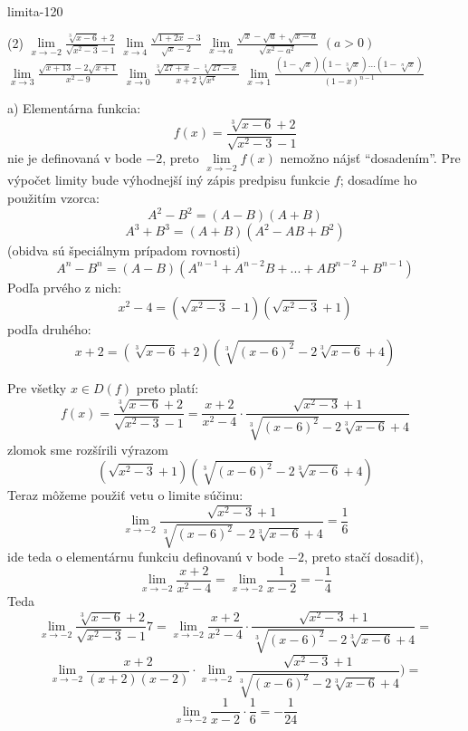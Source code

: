 \begin{defproblem}{limita-120}
\begin{tasks}(2)
    \task $\lim\limits_{{x \to -2}} \frac{\sqrt[3]{x-6}+2}{\sqrt{x^2-3}-1}$
    \task $\lim\limits_{{x \to 4}} \frac{\sqrt{1+2x}-3}{\sqrt{x}-2}$
    \task $\lim\limits_{{x \to a}} \frac{\sqrt{x}-\sqrt{a}+\sqrt{x-a}}{\sqrt{x^2-a^2}}$ $(a>0)$
    \task $\lim\limits_{{x \to 3}} \frac{\sqrt{x+13}-2\sqrt{x+1}}{x^2-9}$
    \task $\lim\limits_{{x \to 0}} \frac{\sqrt[3]{27+x}-\sqrt[3]{27-x}}{x+2\sqrt[3]{x^4}}$
    \task $\lim\limits_{{x \to 1}} \frac{(1-\sqrt{x})(1-\sqrt[3]{x})...(1-\sqrt[n]{x})}{(1-x)^{n-1}}$
\end{tasks}
\begin{solution}
    a) Elementárna funkcia:
    \[
        f(x) = \frac{\sqrt[3]{x - 6} + 2}{\sqrt{x^2 - 3} - 1}
    \]
    nie je definovaná v bode $-2$, preto $\lim\limits_{x \rightarrow -2} f(x)$ nemožno
    nájsť ``dosadením''. Pre výpočet limity bude výhodnejší iný zápis predpisu
    funkcie $f$; dosadíme ho použitím vzorca:
    \[
        A^2 - B^2 = (A - B)(A + B)
    \]
    \[
        A^3 + B^3 = (A + B)(A^2 - AB + B^2)
    \]
    (obidva sú špeciálnym prípadom rovnosti)
    \[
        A^n - B^n = (A - B)(A^{n - 1} + A^{n - 2}B + ... + AB^{n - 2} + B^{n - 1})
    \]
    Podľa prvého z nich:
    \[
        x^2 - 4 = (\sqrt{x^2 - 3} - 1)(\sqrt{x^2 - 3} + 1)
    \]
    podľa druhého:
    \[
        x + 2=(\sqrt[3]{x - 6} + 2)(\sqrt[3]{(x - 6)^2} - 2\sqrt[3]{x - 6} + 4)
    \]

    Pre všetky $x \in D(f)$ preto platí:
    \[
        f(x)
            = \frac{\sqrt[3]{x - 6} + 2}{\sqrt{x^2 - 3} - 1}
            = \frac{x + 2}{x^2 - 4}
              \cdot
              \frac{\sqrt{x^2 - 3} + 1}{\sqrt[3]{(x - 6)^2} - 2\sqrt[3]{x - 6} + 4}
    \]
    zlomok sme rozšírili výrazom
    \[
        (\sqrt{x^2-3} + 1)(\sqrt[3]{(x - 6)^2} - 2\sqrt[3]{x - 6} + 4)
    \]
    Teraz môžeme použiť vetu o limite súčinu:
    \[
        \lim\limits_{x \to -2}
            \frac{\sqrt{x^2 - 3} + 1}{\sqrt[3]{(x - 6)^2} - 2\sqrt[3]{x - 6} + 4}
            = \frac{1}{6}
    \]
    ide teda o elementárnu funkciu definovanú v bode $-2$, preto stačí dosadiť),
    \[
        \lim\limits_{x \to -2} \frac{x+2}{x^2-4}
        = \lim\limits_{x \to -2} \frac{1}{x-2}
        = -\frac{1}{4}
    \]
    Teda
    \[
        \lim\limits_{x \to -2} \frac{\sqrt[3]{x-6}+2}{\sqrt{x^2-3}-1} 7
        = \lim\limits_{x \to -2} \frac{x+2}{x^2-4} \cdot \frac{\sqrt{x^2-3}+1}{\sqrt[3]{(x-6)^2}-2\sqrt[3]{x-6}+4} =
    \]
    \[
        \lim\limits_{x \to -2} \frac{x+2}{(x+2)(x-2)}
        \cdot
        \lim\limits_{x \to -2} \frac{\sqrt{x^2-3}+1}{\sqrt[3]{(x-6)^2}-2\sqrt[3]{x-6}+4}) =
    \]
    \[
        \lim\limits_{x \to -2} \frac{1}{x-2} \cdot \frac{1}{6}
        = -\frac{1}{24}
    \]
\end{solution}
\end{defproblem}

